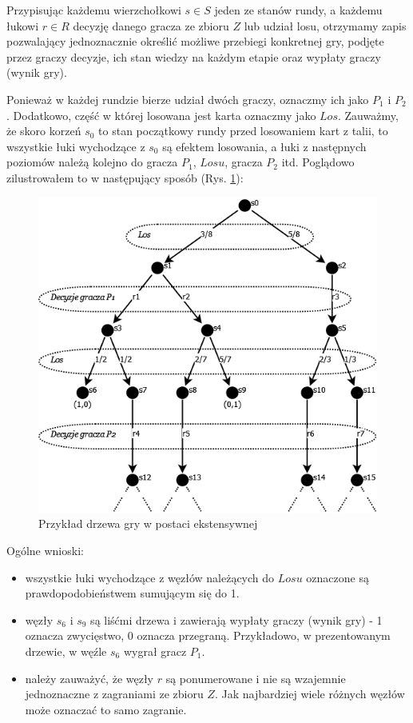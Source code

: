 Przypisując każdemu wierzchołkowi $s \in S$ jeden ze stanów rundy, a każdemu łukowi $r \in R$ decyzję danego gracza ze zbioru $Z$ lub udział losu, otrzymamy zapis pozwalający jednoznacznie określić możliwe przebiegi konkretnej gry, podjęte przez graczy decyzje, ich stan wiedzy na każdym etapie oraz wypłaty graczy (wynik gry).

Ponieważ w każdej rundzie bierze udział dwóch graczy, oznaczmy ich jako $P_1$ i $P_2$. Dodatkowo, część w której losowana jest karta oznaczmy jako $Los$. Zauważmy, że skoro korzeń $s_0$ to stan początkowy rundy przed losowaniem kart z talii, to wszystkie łuki wychodzące z $s_0$ są efektem losowania, a łuki z następnych poziomów należą kolejno do gracza $P_1$, $Losu$, gracza $P_2$ itd. Poglądowo zilustrowałem to w następujący sposób (Rys. \ref{fig:drzewo}):

\begin{figure}[h]
	\centering
	\includegraphics[scale=0.5]{Resources/drzewo2.png}
	\caption{Przykład drzewa gry w postaci ekstensywnej} 
	\label{fig:drzewo}
\end{figure}
Ogólne wnioski:
\begin{itemize}
	\item wszystkie łuki wychodzące z węzłów należących do $Losu$ oznaczone są prawdopodobieństwem sumującym się do 1.
	\item węzły $s_6$ i $s_9$ są liśćmi drzewa i zawierają wypłaty graczy (wynik gry) - 1 oznacza zwycięstwo, 0 oznacza przegraną. Przykładowo, w prezentowanym drzewie, w węźle $s_6$ wygrał gracz $P_1$.
	\item należy zauważyć, że węzły $r$ są ponumerowane i nie są wzajemnie jednoznaczne z zagraniami ze zbioru $Z$. Jak najbardziej wiele różnych węzłów może oznaczać to samo zagranie.
\end{itemize}

